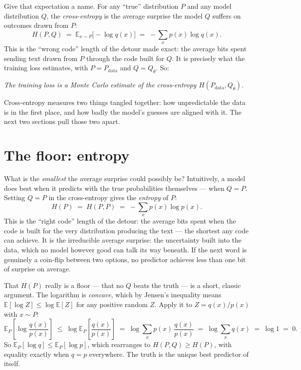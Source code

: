 \documentclass[11pt]{article}
\begin{document}
Give that expectation a name. For any ``true'' distribution $P$ and any model distribution
$Q$, the \emph{cross-entropy} is the average surprise the model $Q$ suffers on outcomes drawn
from $P$:
\[
  H(P, Q) \;=\; \mathbb{E}_{x\sim P}\bigl[-\log q(x)\bigr] \;=\; -\sum_x p(x)\log q(x).
\]
This is the ``wrong code'' length of the detour made exact: the average bits spent sending
text drawn from $P$ through the code built for $Q$. It is precisely what the training loss
estimates, with $P = P_{\text{data}}$ and $Q = Q_\theta$. So:
\begin{center}
\emph{The training loss is a Monte Carlo estimate of the cross-entropy $H(P_{\text{data}},
Q_\theta)$.}
\end{center}
Cross-entropy measures two things tangled together: how unpredictable the data is in the first
place, and how badly the model's guesses are aligned with it. The next two sections pull those
two apart.

\section{The floor: entropy}

What is the \emph{smallest} the average surprise could possibly be? Intuitively, a model does
best when it predicts with the true probabilities themselves --- when $Q = P$. Setting
$Q = P$ in the cross-entropy gives the \emph{entropy} of $P$:
\[
  H(P) \;=\; H(P, P) \;=\; -\sum_x p(x)\log p(x).
\]
This is the ``right code'' length of the detour: the average bits spent when the code is built
for the very distribution producing the text --- the shortest any code can achieve. It is the
irreducible average surprise: the uncertainty built into the data, which no model however good
can talk its way beneath. If the next word is genuinely a coin-flip between two
options, no predictor achieves less than one bit of surprise on average.

That $H(P)$ really is a floor --- that no $Q$ beats the truth --- is a short, classic
argument. The logarithm is \emph{concave}, which by Jensen's inequality means
$\mathbb{E}[\log Z] \le \log \mathbb{E}[Z]$ for any positive random $Z$. Apply it to
$Z = q(x)/p(x)$ with $x \sim P$:
\[
  \mathbb{E}_{P}\!\left[\log\frac{q(x)}{p(x)}\right]
  \;\le\; \log \mathbb{E}_{P}\!\left[\frac{q(x)}{p(x)}\right]
  \;=\; \log \sum_x p(x)\,\frac{q(x)}{p(x)}
  \;=\; \log \sum_x q(x) \;=\; \log 1 \;=\; 0.
\]
So $\mathbb{E}_P[\log q] \le \mathbb{E}_P[\log p]$, which rearranges to $H(P,Q) \ge H(P)$,
with equality exactly when $q = p$ everywhere. The truth is the unique best predictor of
itself.
\end{document}
